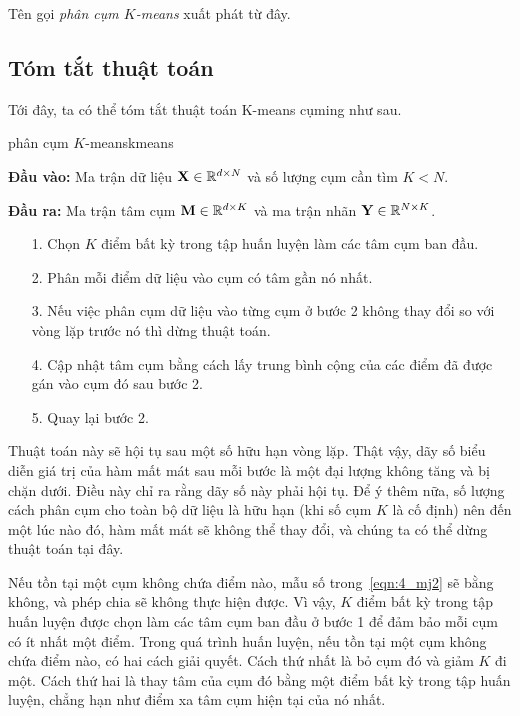 Tên gọi \textit{phân cụm $K$-means} xuất phát từ đây.

\subsection{Tóm tắt thuật toán}
Tới đây, ta có thể tóm tắt thuật toán K-means cụming như sau.
\begin{myalg}{phân cụm $K$-means}{kmeans}

\textbf{Đầu vào:} Ma trận dữ liệu $\mathbf{X} \in \mathbb{R}^{d \times N}$ và số lượng
cụm cần tìm $K < N$.

\textbf{Đầu ra:} Ma trận tâm cụm $\mathbf{M} \in \mathbb{R}^{d \times K}$ và ma trận
nhãn $\mathbf{Y} \in \mathbb{R}^{N\times K}$.

\begin{enumerate}
\item[1.] Chọn $K$ điểm bất kỳ trong tập huấn luyện làm các tâm cụm ban đầu.

\item[2.]  Phân mỗi điểm dữ liệu vào cụm có tâm gần nó nhất.

\item[3.]  Nếu việc phân cụm dữ liệu vào từng cụm ở bước 2 không thay đổi
so với vòng lặp trước nó thì dừng thuật toán.

\item[4.]  Cập nhật tâm cụm bằng cách lấy trung bình cộng của các điểm đã được gán vào cụm đó sau bước 2.

\item[5.]  Quay lại bước 2.
\end{enumerate}
\end{myalg}


Thuật toán này sẽ hội tụ sau một số hữu hạn vòng lặp. Thật vậy, dãy số biểu diễn giá trị của hàm mất mát sau mỗi bước là một đại
lượng không tăng và bị chặn dưới. Điều này chỉ ra rằng dãy số này phải hội tụ.
Để ý thêm nữa, số lượng cách phân cụm cho toàn bộ dữ liệu là hữu hạn (khi số
cụm $K$ là cố định) nên đến một lúc nào đó, hàm mất mát sẽ không thể thay
đổi, và chúng ta có thể dừng thuật toán tại đây.

Nếu tồn tại một cụm không chứa điểm nào, mẫu số trong~\eqref{eqn:4_mj2} sẽ
bằng không, và phép chia sẽ không thực hiện được. Vì vậy, $K$ điểm bất kỳ trong
tập huấn luyện được chọn làm các tâm cụm ban đầu ở bước 1 để đảm bảo mỗi
cụm có ít nhất một điểm. Trong quá trình huấn luyện, nếu tồn tại một cụm
không chứa điểm nào, có hai cách giải quyết. Cách thứ nhất là bỏ cụm đó
và giảm $K$ đi một. Cách thứ hai là thay tâm của cụm đó bằng một điểm
bất kỳ trong tập huấn luyện, chẳng hạn như điểm xa tâm cụm hiện tại của nó nhất.

